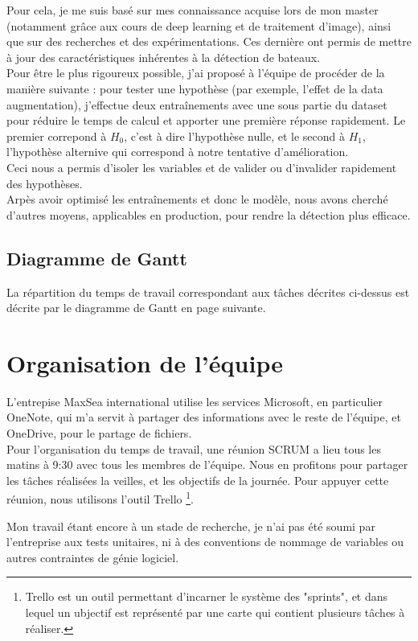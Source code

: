 Pour cela, je me suis basé sur mes connaissance acquise lors de mon master (notamment grâce aux cours
de deep learning et de traitement d'image), ainsi que sur des recherches et des expérimentations.
Ces dernière ont permis de mettre à jour des caractéristiques inhérentes à la détection de bateaux. \\

Pour être le plus rigoureux possible, j'ai proposé à l'équipe de procéder de la manière suivante :
pour tester une hypothèse (par exemple, l'effet de la data augmentation), j'effectue deux entraînements
avec une sous partie du dataset pour réduire le temps de calcul et apporter une première réponse rapidement.
Le premier correpond à \(H_{0}\), c'est à dire l'hypothèse nulle, et le second à \(H_{1}\), l'hypothèse
alternive qui correspond à notre tentative d'amélioration.\\

Ceci nous a permis d'isoler les variables et de valider ou d'invalider rapidement des hypothèses.\\

Arpès avoir optimisé les entraînements et donc le modèle, nous avons cherché d'autres moyens, applicables en production,
pour rendre la détection plus efficace.

\subsection{Diagramme de Gantt}

La répartition du temps de travail correspondant aux tâches décrites ci-dessus est décrite par
le diagramme de Gantt en page suivante.



\section{Organisation de l'équipe}

L'entrepise MaxSea international utilise les services Microsoft, en particulier OneNote,
qui m'a servit à partager des informations avec le reste de l'équipe, et OneDrive,
pour le partage de fichiers.\\

Pour l'organisation du temps de travail, une réunion SCRUM a lieu tous les matins à 9:30 avec
tous les membres de l'équipe. Nous en profitons pour partager les tâches réalisées la veilles,
et les objectifs de la journée. Pour appuyer cette réunion, nous utilisons l'outil Trello \footnote{Trello est
un outil permettant d'incarner le système des "sprints", et dans lequel un ubjectif est représenté par
une carte qui contient plusieurs tâches à réaliser.}.

Mon travail étant encore à un stade de recherche, je n'ai pas été soumi par l'entreprise aux tests unitaires,
ni à des conventions de nommage de variables ou autres contraintes de génie logiciel.
